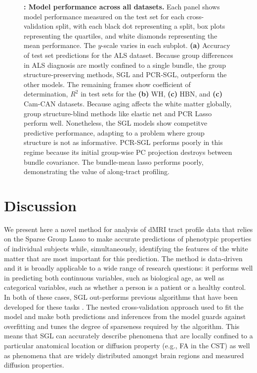 \documentclass[10pt,letterpaper]{article}
\begin{document}
\begin{figure}[b!]
    \caption{%
    {\bf {}: Model performance across all datasets.}
Each panel shows model performance measured on the test set for each
cross-validation split, with each black dot representing a split, box
plots representing the quartiles, and white diamonds representing the mean
performance. The $y$-scale varies in each subplot.
\textbf{(a)} Accuracy of test set predictions for the
ALS dataset. Because group differences
in ALS diagnosis are mostly confined to a single bundle, the group
structure-preserving methods, SGL and PCR-SGL, outperform the other
models.
The remaining frames show coefficient of determination, \protect$R^2$ in test sets
for the \textbf{(b)} WH, \textbf{(c)} HBN, and \textbf{(c)} Cam-CAN
datasets. Because aging affects the white matter globally, group structure-blind
methods like elastic net and PCR Lasso perform well. Nonetheless, the SGL
models show competitve predictive performance, adapting to a problem where
group structure is not as informative. PCR-SGL performs poorly in this regime
because its initial group-wise PC projection destroys between bundle covariance.
The bundle-mean lasso performs poorly, demonstrating the value of along-tract profiling.
    \label{fig:model-performance}
    }
\end{figure}

\section*{Discussion}

We present here a novel method for analysis of dMRI tract profile data that
relies on the Sparse Group Lasso \cite{simon2013sparse} to make accurate
predictions of phenotypic properties of individual subjects while,
simultaneously, identifying the features of the white matter that are most
important for this prediction. The method is data-driven and it is broadly
applicable to a wide range of research questions: it performs well in
predicting both continuous variables, such as biological age, as well as
categorical variables, such as whether a person is a patient or a healthy
control. In both of these cases, SGL out-performs previous algorithms that
have been developed for these tasks \cite{sarica2017corticospinal,
Richard2018-ux, mcpherson2020single}. The nested cross-validation approach
used to fit the model and make both predictions and inferences from the model
guards against overfitting and tunes the degree of sparseness required by the
algorithm. This means that SGL can accurately describe phenomena that are
locally confined to a particular anatomical location or diffusion property
(e.g., FA in the CST) as well as phenomena that are widely distributed
amongst brain regions and measured diffusion properties.
\end{document}
